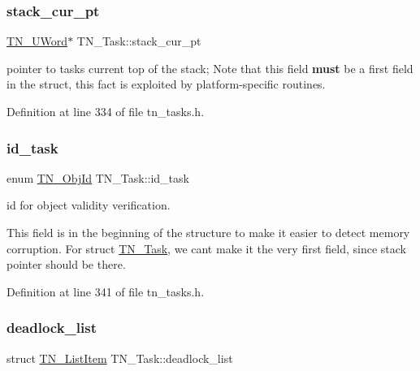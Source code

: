 \subsubsection{\texorpdfstring{stack\+\_\+cur\+\_\+pt}{stack\_cur\_pt}}
{\footnotesize\ttfamily \hyperlink{tn__arch__example_8h_ab80cba0fe9ffcd9011d53dfeb9e39bf4}{T\+N\+\_\+\+U\+Word}$\ast$ T\+N\+\_\+\+Task\+::stack\+\_\+cur\+\_\+pt}



pointer to task\textquotesingle{}s current top of the stack; Note that this field {\bfseries must} be a first field in the struct, this fact is exploited by platform-\/specific routines. 



Definition at line 334 of file tn\+\_\+tasks.\+h.

\mbox{\label{structTN__Task_a014a0a70ae6a23d08b1571ac6b017abd}} 
\subsubsection{\texorpdfstring{id\+\_\+task}{id\_task}}
{\footnotesize\ttfamily enum \hyperlink{tn__common_8h_ae779dd1f6735f6e139fb70acd004d976}{T\+N\+\_\+\+Obj\+Id} T\+N\+\_\+\+Task\+::id\+\_\+task}



id for object validity verification. 

This field is in the beginning of the structure to make it easier to detect memory corruption. For {\ttfamily struct \hyperlink{structTN__Task}{T\+N\+\_\+\+Task}}, we can\textquotesingle{}t make it the very first field, since stack pointer should be there. 

Definition at line 341 of file tn\+\_\+tasks.\+h.

\mbox{\label{structTN__Task_a097e79851e01fb3c73f0346d99ea8b7e}} 
\subsubsection{\texorpdfstring{deadlock\+\_\+list}{deadlock\_list}}
{\footnotesize\ttfamily struct \hyperlink{structTN__ListItem}{T\+N\+\_\+\+List\+Item} T\+N\+\_\+\+Task\+::deadlock\+\_\+list}



